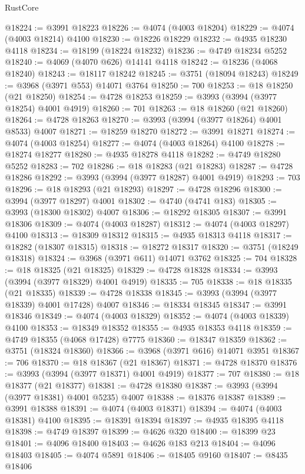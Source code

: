 \begin{lexlean}{RustCore}
\begin{coremodule}
@18224 := @3991 @18223
@18226 := @4074 (@4003 @18204)
@18229 := @4074 (@4003 @18214) @4100
@18230 := @18226 @18229
@18232 := @4935 @18230 @4118
@18234 := @18199 (@18224 @18232)
@18236 := @4749 @18234 @5252
@18240 := @4069 (@4070 @626) @14141 @4118
@18242 := @18236 (@4068 @18240)
@18243 := @18117 @18242
@18245 := @3751 (@18094 @18243)
@18249 := @3968 (@3971 @553) @14071 @3764
@18250 := 700
@18253 := @18 @18250 (@21 @18250)
@18254 := @4728 @18253
@18259 := @3993 (@3994 (@3977 @18254) @4001 @4919)
@18260 := 701
@18263 := @18 @18260 (@21 @18260)
@18264 := @4728 @18263
@18270 := @3993 (@3994 (@3977 @18264) @4001 @8533) @4007
@18271 := @18259 @18270
@18272 := @3991 @18271
@18274 := @4074 (@4003 @18254)
@18277 := @4074 (@4003 @18264) @4100
@18278 := @18274 @18277
@18280 := @4935 @18278 @4118
@18282 := @4749 @18280 @5252
@18283 := 702
@18286 := @18 @18283 (@21 @18283)
@18287 := @4728 @18286
@18292 := @3993 (@3994 (@3977 @18287) @4001 @4919)
@18293 := 703
@18296 := @18 @18293 (@21 @18293)
@18297 := @4728 @18296
@18300 := @3994 (@3977 @18297) @4001
@18302 := @4740 (@4741 @183)
@18305 := @3993 (@18300 @18302) @4007
@18306 := @18292 @18305
@18307 := @3991 @18306
@18309 := @4074 (@4003 @18287)
@18312 := @4074 (@4003 @18297) @4100
@18313 := @18309 @18312
@18315 := @4935 @18313 @4118
@18317 := @18282 (@18307 @18315)
@18318 := @18272 @18317
@18320 := @3751 (@18249 @18318)
@18324 := @3968 (@3971 @611) @14071 @3762
@18325 := 704
@18328 := @18 @18325 (@21 @18325)
@18329 := @4728 @18328
@18334 := @3993 (@3994 (@3977 @18329) @4001 @4919)
@18335 := 705
@18338 := @18 @18335 (@21 @18335)
@18339 := @4728 @18338
@18345 := @3993 (@3994 (@3977 @18339) @4001 @17428) @4007
@18346 := @18334 @18345
@18347 := @3991 @18346
@18349 := @4074 (@4003 @18329)
@18352 := @4074 (@4003 @18339) @4100
@18353 := @18349 @18352
@18355 := @4935 @18353 @4118
@18359 := @4749 @18355 (@4068 @17428) @7775
@18360 := @18347 @18359
@18362 := @3751 (@18324 @18360)
@18366 := @3968 (@3971 @616) @14071 @3951
@18367 := 706
@18370 := @18 @18367 (@21 @18367)
@18371 := @4728 @18370
@18376 := @3993 (@3994 (@3977 @18371) @4001 @4919)
@18377 := 707
@18380 := @18 @18377 (@21 @18377)
@18381 := @4728 @18380
@18387 := @3993 (@3994 (@3977 @18381) @4001 @5235) @4007
@18388 := @18376 @18387
@18389 := @3991 @18388
@18391 := @4074 (@4003 @18371)
@18394 := @4074 (@4003 @18381) @4100
@18395 := @18391 @18394
@18397 := @4935 @18395 @4118
@18398 := @4749 @18397
@18399 := @4626 @320
@18400 := @18399 @23
@18401 := @4096 @18400
@18403 := @4626 @183 @213
@18404 := @4096 @18403
@18405 := @4074 @5891
@18406 := @18405 @9160
@18407 := @8435 @18406

\end{coremodule}
\end{lexlean}
